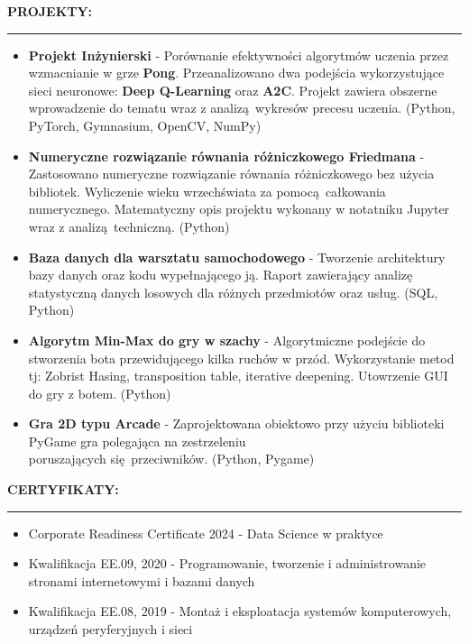 \documentclass[10pt]{article}
\newcommand{\longline}{\rule{19.6cm}{1pt}}
\begin{document}
\noindent \fontsize{14pt}{14pt}\selectfont \textbf{\color{Violet}PROJEKTY:}
\fontsize{10pt}{10pt}\selectfont
\\
\noindent \longline 
\begin{itemize}[leftmargin=*]
    \item \textbf{Projekt Inżynierski} - Porównanie efektywności algorytmów uczenia przez wzmacnianie w grze \textbf{Pong}. 
    Przeanalizowano dwa podejścia wykorzystujące sieci neuronowe: \textbf{Deep Q-Learning} oraz \textbf{A2C}.
    Projekt zawiera obszerne wprowadzenie do tematu wraz z analizą wykresów precesu uczenia. (Python, PyTorch, Gymnasium, OpenCV, NumPy)
    \item \textbf{Numeryczne rozwiązanie równania różniczkowego Friedmana} - Zastosowano numeryczne rozwiązanie równania różniczkowego bez użycia bibliotek.
    Wyliczenie wieku wrzechświata za pomocą całkowania numerycznego. Matematyczny opis projektu wykonany w notatniku Jupyter wraz z analizą techniczną. (Python)
    \item \textbf{Baza danych dla warsztatu samochodowego} - Tworzenie architektury bazy danych oraz kodu wypełnającego ją. 
    Raport zawierający analizę statystyczną danych losowych dla różnych przedmiotów oraz usług. (SQL, Python)
    \item \textbf{Algorytm Min-Max do gry w szachy} - Algorytmiczne podejście do stworzenia bota przewidującego kilka ruchów w przód.
    Wykorzystanie metod tj: Zobrist Hasing, transposition table, iterative deepening. Utowrzenie GUI do gry z botem. (Python)
    \item \textbf{Gra 2D typu Arcade} - Zaprojektowana obiektowo przy użyciu biblioteki PyGame gra polegająca na zestrzeleniu \\ poruszających się przeciwników. (Python, Pygame)
\end{itemize}

\noindent \fontsize{14pt}{14pt}\selectfont \textbf{\color{Violet}CERTYFIKATY:}
\fontsize{10pt}{10pt}\selectfont 
\\ 
\noindent \longline 
\begin{itemize}[leftmargin=*]
    \item Corporate Readiness Certificate 2024 - Data Science w praktyce
    \item Kwalifikacja EE.09, 2020 - Programowanie, tworzenie i administrowanie stronami internetowymi i bazami danych 
    \item Kwalifikacja EE.08, 2019 - Montaż i eksploatacja systemów komputerowych, urządzeń peryferyjnych i sieci
\end{itemize}
\end{document}
